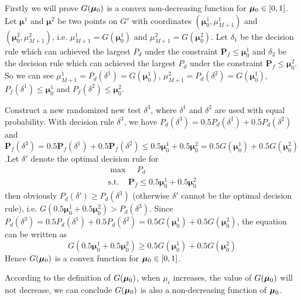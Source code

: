 \documentclass[12pt,journal,a4paper,twoside,onecolumn]{IEEEtran}
\begin{document}
\begin{spacing}{2.5}
Firstly we will prove $G(\boldsymbol{\mu}_0)$ is a convex non-decreasing function for $\boldsymbol{\mu}_0 \in [0, 1]$.
 Let $\boldsymbol{\mu}^1$ and  $\boldsymbol{\mu}^2$ be two points on $G'$ with coordinates $(\boldsymbol{\mu}^1_0, \mu_{M+1}^1)$ and $(\boldsymbol{\mu}^2_0, \mu_{M+1}^2)$, i.e. $\mu_{M+1}^1 = G(\boldsymbol{\mu}_0^1)$ and $\mu_{M+1}^2 = G(\boldsymbol{\mu}_0^2)$. Let $\delta_1$ be the decision rule which can achieved the largest $P_d$ under the constraint $\mathbf{P}_f \leq \boldsymbol{\mu}_0^1$ and $\delta_2$ be the decision rule which can achieved the largest $P_d$ under the constraint $\mathbf{P}_{f} \leq \boldsymbol{\mu}_0^2$. So we can see $\mu_{M+1}^1 = P_d(\delta^1) = G(\boldsymbol{\mu}_0^1)$, $\mu_{M+1}^2 = P_d(\delta^2)=G(\boldsymbol{\mu}_0^1)$, $P_f(\delta^1) \leq \boldsymbol{\mu}^1_0$ and $P_f(\delta^2) \leq \boldsymbol{\mu}^2_0$.

Construct a new randomized new test $\delta^3$, where $\delta^1$ and $\delta^2$ are used with equal probability. With decision rule $\delta^3$, we have $P_d(\delta^3) = 0.5P_d(\delta^1)+0.5P_d(\delta^2)$ and $\mathbf{P}_{f}(\delta^3) = 0.5\mathbf{P}_f(\delta^1)+0.5\mathbf{P}_f(\delta^2) \leq 0.5\boldsymbol{\mu}^1_0 + 0.5\boldsymbol{\mu}^2_0 = 0.5G(\boldsymbol{\mu}_0^1) + 0.5G(\boldsymbol{\mu}_0^2)$.Let $\delta'$ denote the optimal decision rule for 
 \begin{equation}
 \begin{split}
 \max\;\;\;\;P_d\\
 \text{s.t.}\;\;\;\;\mathbf{P}_f \leq 0.5\boldsymbol{\mu}^1_0 + 0.5\boldsymbol{\mu}^2_0
 \end{split}
 \end{equation}
then obviously $P_d(\delta') \geq P_d(\delta^3)$ (otherwise $\delta'$ cannot be the optimal decision rule), i.e. $G(0.5\boldsymbol{\mu}^1_0 + 0.5\boldsymbol{\mu}^2_0) > P_d(\delta^3)$. Since $P_d(\delta^3) = 0.5P_d(\delta^1)+0.5P_d(\delta^2) = 0.5 G(\boldsymbol{\mu}^1_0)+ 0.5 G(\boldsymbol{\mu}^2_0)$, the equation can be written as 
\begin{equation}
G(0.5\boldsymbol{\mu}^1_0 + 0.5\boldsymbol{\mu}^2_0) \geq 0.5 G(\boldsymbol{\mu}^1_0)+ 0.5 G(\boldsymbol{\mu}^2_0)
\end{equation}
Hence $G(\boldsymbol{\mu}_0)$ is a convex function for $\boldsymbol{\mu}_0 \in [0, 1]$.

According to the definition of $G(\boldsymbol{\mu}_0)$, when $\mu_i$ increases, the value of $G(\boldsymbol{\mu}_0)$ will not decrease, we can conclude $G(\boldsymbol{\mu}_0)$ is also a non-decreasing function of $\boldsymbol{\mu}_0$. 


\end{spacing}
\end{document}

